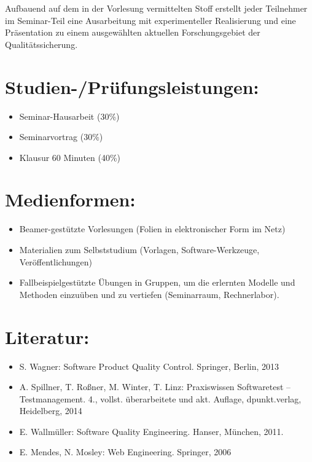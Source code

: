 Aufbauend auf dem in der Vorlesung vermittelten Stoff erstellt jeder
Teilnehmer im Seminar-Teil eine Ausarbeitung mit experimenteller
Realisierung und eine Präsentation zu einem ausgewählten aktuellen
Forschungsgebiet der Qualitätssicherung.

\section*{Studien-/Prüfungsleistungen:}\label{studien-pruxfcfungsleistungen-21}

\begin{itemize}
\tightlist
\item
  Seminar-Hausarbeit (30\%)
\item
  Seminarvortrag (30\%)
\item
  Klausur 60 Minuten (40\%)
\end{itemize}

\section*{Medienformen:}\label{medienformen-21}

\begin{itemize}
\tightlist
\item
  Beamer-gestützte Vorlesungen (Folien in elektronischer Form im Netz)
\item
  Materialien zum Selbststudium (Vorlagen, Software-Werkzeuge,
  Veröffentlichungen)
\item
  Fallbeispielgestützte Übungen in Gruppen, um die erlernten Modelle und
  Methoden einzuüben und zu vertiefen (Seminarraum, Rechnerlabor).
\end{itemize}

\section*{Literatur:}\label{literatur-21}

\begin{itemize}
\tightlist
\item
  S. Wagner: Software Product Quality Control. Springer, Berlin, 2013
\item
  A. Spillner, T. Roßner, M. Winter, T. Linz: Praxiswissen Softwaretest
  -- Testmanagement. 4., vollst. überarbeitete und akt. Auflage,
  dpunkt.verlag, Heidelberg, 2014
\item
  E. Wallmüller: Software Quality Engineering. Hanser, München, 2011.
\item
  E. Mendes, N. Mosley: Web Engineering. Springer, 2006
\end{itemize}

